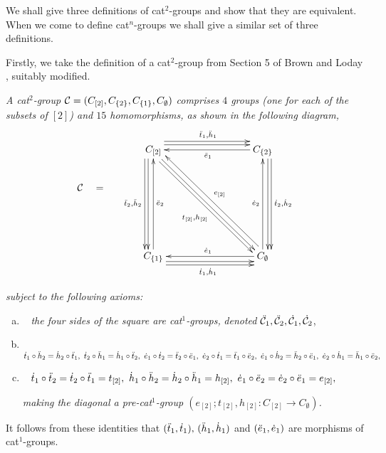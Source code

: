 We shall give three definitions of cat$^2$-groups 
and show that they are equivalent. 
When we come to define cat$^n$-groups we shall give a similar set of 
three definitions. 

Firstly, we take the definition of a cat$^2$-group from 
Section 5 of Brown and Loday \cite{brow:lod}, suitably modified.

\begin{defn} \label{defn:cat2a} 
\emph{A cat$^2$-group  $\mathcal{C} = (C_{[2]},C_{\{2\}},C_{\{1\}},C_{\emptyset})$  
comprises $4$ groups (one for each of the subsets of $[2]$) 
and $15$ homomorphisms, as shown in the following diagram,}
\begin{equation} \label{eq:cat2-diag1}
\vcenter{\xymatrix{
 & C_{[2]} \ar[ddd] <-1.2ex>  \ar[ddd] <-2.0ex>_{\ddttt,\ddhht}
     \ar[rrr] <+1.2ex>  \ar[rrr] <+2.0ex>^{\ddtto,\ddhho}
     \ar[dddrrr] <-0.2ex>  \ar[dddrrr] <-1.0ex>_(0.55){\ttot,\hhot}
    &&&  C_{\{2\}}  \ar[lll]^{\ddeeo}
            \ar[ddd]<+1.2ex>  \ar[ddd] <+2.0ex>^{\dttt,\dhht}  \\
\calC \quad = \quad
 &  &&&   \\
 &  &&&   \\
 & C_{\{1\}} \ar[uuu]_{\ddeet}
     \ar[rrr] <-1.2ex>  \ar[rrr] <-2.0ex>_{\dtto,\dhho} 
    &&&  C_{\emptyset} \ar[uuu]^{\deet}   \ar[lll]_{\deeo} 
           \ar[uuulll] <-1.0ex>_{\eeot}
 \\
}}
\end{equation}

\noindent
\emph{subject to the following axioms:}
\begin{enumerate}[(a)]
\item~
\emph{the four sides of the square are cat$^1$-groups,}
\emph{denoted} $\ddot{\mathcal{C}}_1, \ddot{\mathcal{C}}_2, \dot{\mathcal{C}}_1, \dot{\mathcal{C}}_2$,
\item~
$
 \dot{t}_1\circ\ddot{h}_2 = \dot{h}_2\circ\ddot{t}_1, ~
 \dot{t}_2\circ\ddot{h}_1 = \dot{h}_1\circ\ddot{t}_2, ~
 \dot{e}_1\circ\dot{t}_2 = \ddot{t}_2\circ\ddot{e}_1, ~
 \dot{e}_2\circ\dot{t}_1 = \ddot{t}_1\circ\ddot{e}_2, ~
 \dot{e}_1\circ\dot{h}_2 = \ddot{h}_2\circ\ddot{e}_1, ~
 \dot{e}_2\circ\dot{h}_1 = \ddot{h}_1\circ\ddot{e}_2,$
\item~
$\dot{t}_1\circ\ddot{t}_2 = \dot{t}_2\circ\ddot{t}_1 = t_{[2]}, ~ 
 \dot{h}_1\circ\ddot{h}_2 = \dot{h}_2\circ\ddot{h}_1 = h_{[2]}, ~
 \dot{e}_1\circ\ddot{e}_2 = \dot{e}_2\circ\ddot{e}_1 = e_{[2]},$

\emph{making the diagonal a pre-cat$^1$-group
$(e_{[2]}; t_{[2]}, h_{[2]} : C_{[2]} \to C_{\emptyset})$.}
\end{enumerate}
\end{defn}

\noindent
It follows from these identities that 
$(\ddot{t}_1,\dot{t}_1),\,(\ddot{h}_1,\dot{h}_1)$ and $(\ddot{e}_1,\dot{e}_1)$ 
are morphisms of cat$^1$-groups.


